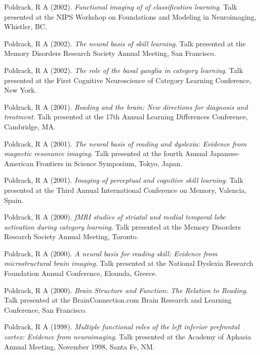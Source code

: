 \documentclass[10pt, letterpaper]{article}
\begin{document}
Poldrack, R A (2002). \emph{Functional imaging of of classification learning}. Talk presented at the NIPS Workshop on Foundations and Modeling in Neuroimaging, Whistler, BC. \vspace{2mm}

Poldrack, R A (2002). \emph{The neural basis of skill learning}. Talk presented at the Memory Disorders Research Society Annual Meeting, San Francisco. \vspace{2mm}

Poldrack, R A (2002). \emph{ The role of the basal ganglia in category learning}. Talk presented at the First Cognitive Neuroscience of Category Learning Conference, New York. \vspace{2mm}

Poldrack, R A (2001). \emph{Reading and the brain: New directions for diagnosis and treatment}. Talk presented at the 17th Annual Learning Differences Conference, Cambridge, MA. \vspace{2mm}

Poldrack, R A (2001). \emph{The neural basis of reading and dyslexia: Evidence from magnetic resonance imaging}. Talk presented at the fourth Annual Japanese-American Frontiers in Science Symposium, Tokyo, Japan. \vspace{2mm}

Poldrack, R A (2001). \emph{Imaging of perceptual and cognitive skill learning}. Talk presented at the Third Annual International Conference on Memory, Valencia, Spain. \vspace{2mm}

Poldrack, R A (2000). \emph{fMRI studies of striatal and medial temporal lobe activation during category learning}. Talk presented at the Memory Disorders Research Society Annual Meeting, Toronto. \vspace{2mm}

Poldrack, R A (2000). \emph{A neural basis for reading skill: Evidence from microstructural brain imaging}. Talk presented at the National Dyslexia Research Foundation Annual Conference, Elounda, Greece. \vspace{2mm}

Poldrack, R A (2000). \emph{Brain Structure and Function: The Relation to Reading}. Talk presented at the BrainConnection.com Brain Research and Learning Conference, San Francisco. \vspace{2mm}

Poldrack, R A (1998). \emph{Multiple functional roles of the left inferior prefrontal cortex: Evidence from neuroimaging}. Talk presented at the Academy of Aphasia Annual Meeting, November 1998, Santa Fe, NM. \vspace{2mm}
\end{document}
